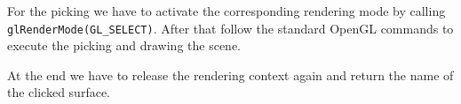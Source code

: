 \documentclass[jou,noapacite]{apa}
\begin{document}
For the picking we have to activate the corresponding rendering mode by
calling \lstinline|glRenderMode(GL_SELECT)|.
%
After that follow the standard OpenGL commands to execute the picking and
drawing the scene.

At the end we have to release the rendering context again and return the name
of the clicked surface.
%
\end{document}
